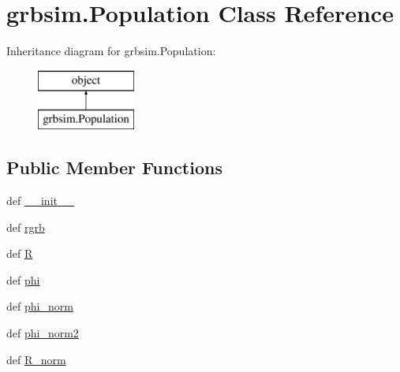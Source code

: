 \hypertarget{classgrbsim_1_1_population}{\section{grbsim.\-Population Class Reference}
\label{classgrbsim_1_1_population}
}
Inheritance diagram for grbsim.\-Population\-:\begin{figure}[H]
\begin{center}
\leavevmode
\includegraphics[height=2.000000cm]{df/d09/classgrbsim_1_1_population}
\end{center}
\end{figure}
\subsection*{Public Member Functions}
\begin{DoxyCompactItemize}
\item 
def \hyperlink{classgrbsim_1_1_population_a669b24d11e789de8c0f1082969d5f1e7}{\-\_\-\-\_\-init\-\_\-\-\_\-}
\item 
def \hyperlink{classgrbsim_1_1_population_af0b9b973b441194889c09073e5e473d4}{rgrb}
\item 
def \hyperlink{classgrbsim_1_1_population_a8d0cf186fe48e6ee48e4c3242ef2b47f}{R}
\item 
def \hyperlink{classgrbsim_1_1_population_a1dc31a9ab970799cbe6aeb485fe3eb9e}{phi}
\item 
def \hyperlink{classgrbsim_1_1_population_aa004fe972bb93a589685b1ea8f4855d7}{phi\-\_\-norm}
\item 
def \hyperlink{classgrbsim_1_1_population_a7e631a73173093618e561d34b730164b}{phi\-\_\-norm2}
\item 
def \hyperlink{classgrbsim_1_1_population_a9bd7c5802bc016a63987c541831cc21a}{R\-\_\-norm}
\end{DoxyCompactItemize}
